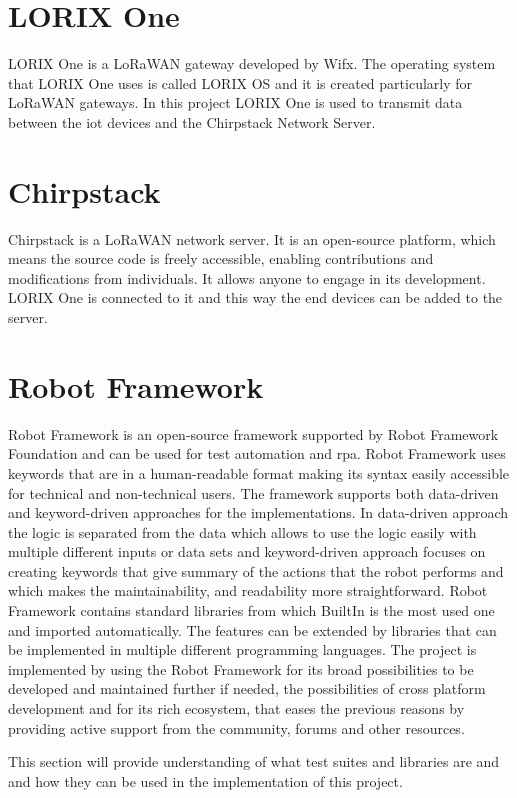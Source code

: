 \section{LORIX One}
LORIX One is a LoRaWAN gateway developed by Wifx.
The operating system that LORIX One uses is called LORIX OS and it is created particularly for LoRaWAN gateways.
In this project LORIX One is used to transmit data between the \gls{iot} devices and the Chirpstack Network Server.

\section{Chirpstack}
Chirpstack is a LoRaWAN network server. It is an open-source platform, which means the source code is freely accessible, enabling contributions and modifications from individuals. It allows anyone to engage in its development. LORIX One is connected to it and this way the end devices can be added to the server.

\section{Robot Framework}
Robot Framework is an open-source framework supported by Robot Framework Foundation and can be used for test automation and \gls{rpa}.
Robot Framework uses keywords that are in a human-readable format making its syntax easily accessible for technical and non-technical users.
The framework supports both data-driven and keyword-driven approaches for the implementations.
In data-driven approach the logic is separated from the data which allows to use the logic easily with multiple different inputs or data sets and keyword-driven approach focuses on creating keywords that give summary of the actions that the robot performs and which makes the maintainability, and readability more straightforward.
Robot Framework contains standard libraries from which BuiltIn is the most used one and imported automatically.
The features can be extended by libraries that can be implemented in multiple different programming languages.
The project is implemented by using the Robot Framework for its broad possibilities to be developed and maintained further if needed, the possibilities of cross platform development and for its rich ecosystem, that eases the previous reasons by providing active support from the community, forums and other resources.

This section will provide understanding of what test suites and libraries are and and how they can be used in the implementation of this project.

